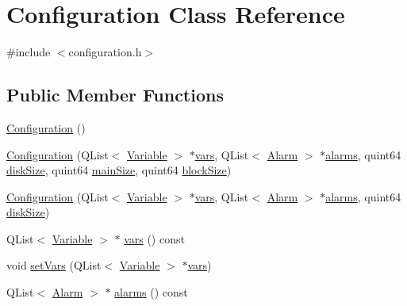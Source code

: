 \hypertarget{class_configuration}{}\section{Configuration Class Reference}
\label{class_configuration}


{\ttfamily \#include $<$configuration.\+h$>$}

\subsection*{Public Member Functions}
\begin{DoxyCompactItemize}
\item 
\hyperlink{class_configuration_a779947337bf652f0e773cb29f37f14ba}{Configuration} ()
\item 
\hyperlink{class_configuration_a79b9f67112073795b73a100109a753b1}{Configuration} (Q\+List$<$ \hyperlink{class_variable}{Variable} $>$ $\ast$\hyperlink{class_configuration_a3ea2192ecb7519e4b96851b6aafc64af}{vars}, Q\+List$<$ \hyperlink{class_alarm}{Alarm} $>$ $\ast$\hyperlink{class_configuration_a24dda4e30193ca5d10a5f38321486e34}{alarms}, quint64 \hyperlink{class_configuration_a8634dd775094fde2f1210b1c59cf644a}{disk\+Size}, quint64 \hyperlink{class_configuration_ac1e6ce4f45dc4495301dd2a37e567a60}{main\+Size}, quint64 \hyperlink{class_configuration_a888d04b4405f6ee88862aa81e9de4967}{block\+Size})
\item 
\hyperlink{class_configuration_a1c86e5a5407c9b4768f26c78e67f4c80}{Configuration} (Q\+List$<$ \hyperlink{class_variable}{Variable} $>$ $\ast$\hyperlink{class_configuration_a3ea2192ecb7519e4b96851b6aafc64af}{vars}, Q\+List$<$ \hyperlink{class_alarm}{Alarm} $>$ $\ast$\hyperlink{class_configuration_a24dda4e30193ca5d10a5f38321486e34}{alarms}, quint64 \hyperlink{class_configuration_a8634dd775094fde2f1210b1c59cf644a}{disk\+Size})
\item 
Q\+List$<$ \hyperlink{class_variable}{Variable} $>$ $\ast$ \hyperlink{class_configuration_a3ea2192ecb7519e4b96851b6aafc64af}{vars} () const 
\item 
void \hyperlink{class_configuration_ac5cb6f816f9572c9006b39567d6382fa}{set\+Vars} (Q\+List$<$ \hyperlink{class_variable}{Variable} $>$ $\ast$\hyperlink{class_configuration_a3ea2192ecb7519e4b96851b6aafc64af}{vars})
\item 
Q\+List$<$ \hyperlink{class_alarm}{Alarm} $>$ $\ast$ \hyperlink{class_configuration_a24dda4e30193ca5d10a5f38321486e34}{alarms} () const 
\item 

\end{DoxyCompactItemize}

